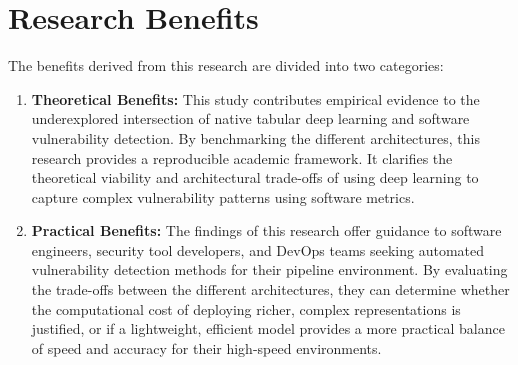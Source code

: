 \section{Research Benefits}


The benefits derived from this research are divided into two categories:

\begin{enumerate}
  \item \textbf{Theoretical Benefits:} This study contributes empirical evidence to the underexplored intersection of native tabular deep learning and software vulnerability detection. By benchmarking the different architectures, this research provides a reproducible academic framework. It clarifies the theoretical viability and architectural trade-offs of using deep learning to capture complex vulnerability patterns using software metrics.
  \item \textbf{Practical Benefits:} The findings of this research offer guidance to software engineers, security tool developers, and DevOps teams seeking automated vulnerability detection methods for their pipeline environment. By evaluating the trade-offs between the different architectures, they can determine whether the computational cost of deploying richer, complex representations is justified, or if a lightweight, efficient model provides a more practical balance of speed and accuracy for their high-speed environments.
\end{enumerate}
